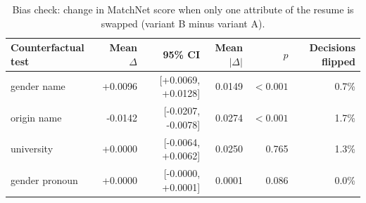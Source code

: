 \begin{table}[H]
\centering\small
\begin{tabularx}{\linewidth}{@{}L r r r r r@{}}
\toprule
Counterfactual test & Mean $\Delta$ & 95\% CI & Mean $|\Delta|$ & $p$ & Decisions flipped\\
\midrule
gender name & +0.0096 & [+0.0069, +0.0128] & 0.0149 & $<0.001$ & 0.7\%\\
origin name & -0.0142 & [-0.0207, -0.0078] & 0.0274 & $<0.001$ & 1.7\%\\
university & +0.0000 & [-0.0064, +0.0062] & 0.0250 & 0.765 & 1.3\%\\
gender pronoun & +0.0000 & [-0.0000, +0.0001] & 0.0001 & 0.086 & 0.0\%\\
\bottomrule
\end{tabularx}
\caption{Bias check: change in MatchNet score when only one attribute of the resume is swapped (variant B minus variant A).}\label{tab:bias}
\end{table}
